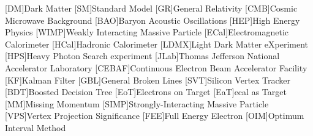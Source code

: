 
\usepackage{silence} %

\usepackage{epsfig} %
\usepackage{epic} %
\usepackage{eepic} %
\usepackage{url} %
\usepackage{longtable} %
\usepackage{mathrsfs} %
\usepackage{multirow} %
\usepackage{bigstrut} %
\usepackage{amssymb} %
\usepackage{graphicx} %
\usepackage{setspace} %
\usepackage{xspace} %
\usepackage{amsmath} %
\usepackage{siunitx} %
\usepackage{booktabs} %
\usepackage{hyperref} %
\usepackage{subcaption}
\usepackage{graphicx} %

\usepackage[noabbrev,capitalise]{cleveref} %

\newcommand{\creflastconjunction}{, and } %

\usepackage[compat=1.1.0]{tikz-feynman} %

\usepackage{hepunits}

\newcommand{\fourgev}{\qty{4}{GeV}\xspace}
\newcommand{\eightgev}{\qty{8}{GeV}\xspace}
\newcommand{\ecal}{ECal}
\newcommand{\hcal}{HCal}

\usepackage{acronym}
[DM]{Dark Matter}
[SM]{Standard Model}
[GR]{General Relativity}
[CMB]{Cosmic Microwave Background}
[BAO]{Baryon Acoustic Oscillations}
[HEP]{High Energy Physics}
[WIMP]{Weakly Interacting Massive Particle}
[ECal]{Electromagnetic Calorimeter}
[HCal]{Hadronic Calorimeter}
[LDMX]{Light Dark Matter eXperiment}
[HPS]{Heavy Photon Search experiment}
[JLab]{Thomas Jefferson National Accelerator Laboratory}
[CEBAF]{Continuous Electron Beam Accelerator Facility}
[KF]{Kalman Filter}
[GBL]{General Broken Lines}
[SVT]{Silicon Vertex Tracker}
[BDT]{Boosted Decision Tree}
[EoT]{Electrons on Target}
[EaT]{\ac{ecal} as Target}
[MM]{Missing Momentum}
[SIMP]{Strongly-Interacting Massive Particle}
[VPS]{Vertex Projection Significance}
[FEE]{Full Energy Electron}
[OIM]{Optimum Interval Method}

